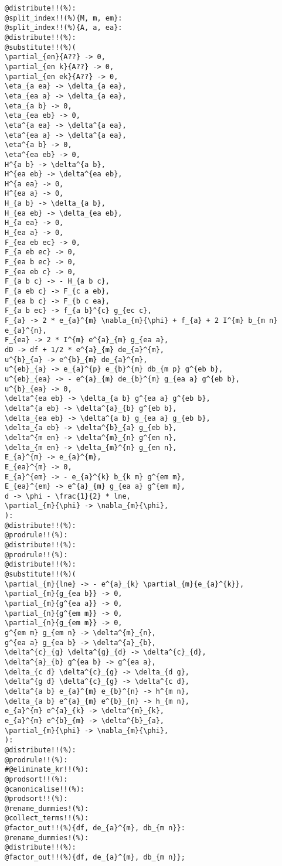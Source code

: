 \documentclass[11pt]{article}
\begin{document}
{\color[named]{Blue}\begin{verbatim}
@distribute!!(%):
@split_index!!(%){M, m, em}:
@split_index!!(%){A, a, ea}:
@distribute!!(%):
@substitute!!(%)(
\partial_{en}{A??} -> 0,
\partial_{en k}{A??} -> 0,
\partial_{en ek}{A??} -> 0,
\eta_{a ea} -> \delta_{a ea},
\eta_{ea a} -> \delta_{a ea},
\eta_{a b} -> 0,
\eta_{ea eb} -> 0,
\eta^{a ea} -> \delta^{a ea},
\eta^{ea a} -> \delta^{a ea},
\eta^{a b} -> 0,
\eta^{ea eb} -> 0,
H^{a b} -> \delta^{a b},
H^{ea eb} -> \delta^{ea eb},
H^{a ea} -> 0,
H^{ea a} -> 0,
H_{a b} -> \delta_{a b},
H_{ea eb} -> \delta_{ea eb},
H_{a ea} -> 0,
H_{ea a} -> 0,
F_{ea eb ec} -> 0,
F_{a eb ec} -> 0,
F_{ea b ec} -> 0,
F_{ea eb c} -> 0,
F_{a b c} -> - H_{a b c},
F_{a eb c} -> F_{c a eb},
F_{ea b c} -> F_{b c ea},
F_{a b ec} -> f_{a b}^{c} g_{ec c},
F_{a} -> 2 * e_{a}^{m} \nabla_{m}{\phi} + f_{a} + 2 I^{m} b_{m n} e_{a}^{n},
F_{ea} -> 2 * I^{m} e^{a}_{m} g_{ea a},
dD -> df + 1/2 * e^{a}_{m} de_{a}^{m},
u^{b}_{a} -> e^{b}_{m} de_{a}^{m},
u^{eb}_{a} -> e_{a}^{p} e_{b}^{m} db_{m p} g^{eb b},
u^{eb}_{ea} -> - e^{a}_{m} de_{b}^{m} g_{ea a} g^{eb b},
u^{b}_{ea} -> 0,
\delta^{ea eb} -> \delta_{a b} g^{ea a} g^{eb b},
\delta^{a eb} -> \delta^{a}_{b} g^{eb b},
\delta_{ea eb} -> \delta^{a b} g_{ea a} g_{eb b},
\delta_{a eb} -> \delta^{b}_{a} g_{eb b},
\delta^{m en} -> \delta^{m}_{n} g^{en n},
\delta_{m en} -> \delta_{m}^{n} g_{en n},
E_{a}^{m} -> e_{a}^{m},
E_{ea}^{m} -> 0,
E_{a}^{em} -> - e_{a}^{k} b_{k m} g^{em m},
E_{ea}^{em} -> e^{a}_{m} g_{ea a} g^{em m},
d -> \phi - \frac{1}{2} * lne,
\partial_{m}{\phi} -> \nabla_{m}{\phi},
):
@distribute!!(%):
@prodrule!!(%):
@distribute!!(%):
@prodrule!!(%):
@distribute!!(%):
@substitute!!(%)(
\partial_{m}{lne} -> - e^{a}_{k} \partial_{m}{e_{a}^{k}},
\partial_{m}{g_{ea b}} -> 0,
\partial_{m}{g^{ea a}} -> 0,
\partial_{n}{g^{em m}} -> 0,
\partial_{n}{g_{em m}} -> 0,
g^{em m} g_{em n} -> \delta^{m}_{n},
g^{ea a} g_{ea b} -> \delta^{a}_{b},
\delta^{c}_{g} \delta^{g}_{d} -> \delta^{c}_{d},
\delta^{a}_{b} g^{ea b} -> g^{ea a},
\delta_{c d} \delta^{c}_{g} -> \delta_{d g},
\delta^{g d} \delta^{c}_{g} -> \delta^{c d},
\delta^{a b} e_{a}^{m} e_{b}^{n} -> h^{m n},
\delta_{a b} e^{a}_{m} e^{b}_{n} -> h_{m n},
e_{a}^{m} e^{a}_{k} -> \delta^{m}_{k},
e_{a}^{m} e^{b}_{m} -> \delta^{b}_{a},
\partial_{m}{\phi} -> \nabla_{m}{\phi},
):
@distribute!!(%):
@prodrule!!(%):
#@eliminate_kr!!(%):
@prodsort!!(%):
@canonicalise!!(%):
@prodsort!!(%):
@rename_dummies!(%):
@collect_terms!!(%):
@factor_out!!(%){df, de_{a}^{m}, db_{m n}}:
@rename_dummies!(%):
@distribute!!(%):
@factor_out!!(%){df, de_{a}^{m}, db_{m n}};
\end{verbatim}}
\end{document}

